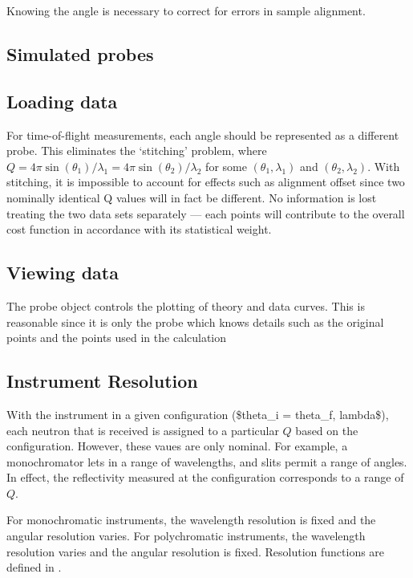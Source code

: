 \documentclass[letterpaper,10pt,english]{sphinxmanual}
\begin{document}
Knowing the angle is necessary to correct for errors in sample alignment.


\subsection{Simulated probes}
\label{guide/data:simulated-probes}\label{guide/data:data-simulation}

\subsection{Loading data}
\label{guide/data:loading-data}\label{guide/data:data-loading}
For time-of-flight measurements, each angle should be represented as
a different probe.  This eliminates the `stitching' problem, where
$Q = 4 \pi \sin(\theta_1)/\lambda_1 = 4 \pi \sin(\theta_2)/\lambda_2$
for some $(\theta_1,\lambda_1)$ and $(\theta_2,\lambda_2)$.
With stitching, it is impossible to account for effects such as
alignment offset since two nominally identical Q values will in
fact be different.  No information is lost treating the two data sets
separately --- each points will contribute to the overall cost function
in accordance with its statistical weight.


\subsection{Viewing data}
\label{guide/data:data-views}\label{guide/data:viewing-data}
The probe object controls the plotting of theory and data curves.  This
is reasonable since it is only the probe which knows details such as
the original points and the points used in the calculation


\subsection{Instrument Resolution}
\label{guide/data:data-resolution}\label{guide/data:instrument-resolution}
With the instrument in a given configuration (\$theta\_i = theta\_f, lambda\$),
each neutron that is received is assigned to a particular $Q$ based on
the configuration.  However, these vaues are only nominal.  For example,
a monochromator lets in a range of wavelengths, and slits permit a range
of angles.  In effect, the reflectivity measured at the configuration
corresponds to a range of $Q$.

For monochromatic instruments, the wavelength resolution is fixed and
the angular resolution varies.  For polychromatic instruments, the
wavelength resolution varies and the angular resolution is fixed.
Resolution functions are defined in {\hyperref[api/resolution:module-refl1d.resolution]{}}.
\end{document}
